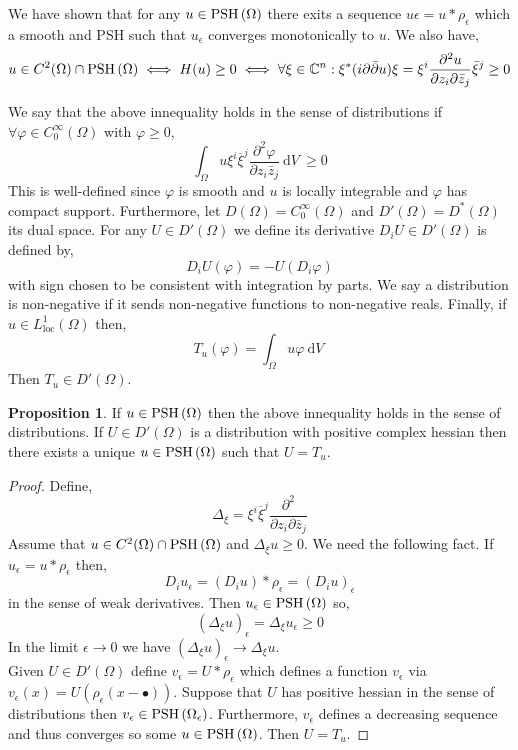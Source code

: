\documentclass[12pt]{extarticle}
\newcommand{\C}{\mathbb{C}}
\renewcommand{\d}[1]{\: \mathrm{d}#1 \:}
\theoremstyle{definition}
\newtheorem{proposition}[theorem]{Proposition}
\newenvironment{definition}[1][Definition:]{\begin{trivlist}
\item[\hskip \labelsep {\bfseries #1}]}{\end{trivlist}}
\begin{document}
We have shown that for any $u \in \mathrm{PSH}\left( \Omega \right)$ there exits a sequence $u\epsilon = u * \rho_\epsilon$ which a smooth and PSH such that $u_\epsilon$ converges monotonically to $u$. We also have,
\[ u \in C^2(\Omega) \cap \PSH{\Omega} \iff H(u) \ge 0 \iff \forall \xi \in \C^n  : \xi^* (i \partial \bar{\partial} u) \xi = \xi^i \frac{\partial^2 u}{\partial z_i \partial \bar{z}_j} \bar{\xi}^j \ge 0 \]


\begin{definition}
We say that the above innequality holds in the sense of distributions if $\forall \varphi \in C^\infty_0(\Omega)$ with $\varphi \ge 0$,
\[ \int_\Omega u \xi^i \overline{\xi}^j \frac{\partial^2 \varphi}{\partial z_i \bar{z}_j} \d{V} \ge 0 \]
This is well-defined since $\varphi$ is smooth and $u$ is locally integrable and $\varphi$ has compact support. Furthermore, let $D(\Omega) = C^\infty_0(\Omega)$ and $D'(\Omega) = D^*(\Omega)$ its dual space. For any $U \in D'(\Omega)$ we define its derivative $D_i U \in D'(\Omega)$ is defined by,
\[ D_i U(\varphi) = - U(D_i \varphi) \]
with sign chosen to be consistent with integration by parts. We say a distribution is non-negative if it sends non-negative functions to non-negative reals. Finally, if $u \in L^1_{\text{loc}}(\Omega)$ then,
\[ T_u(\varphi) = \int_{\Omega} u \varphi \d{V} \]
Then $T_u \in D'(\Omega)$. 
\end{definition}

\begin{proposition}
If $u \in \mathrm{PSH}\left( \Omega \right)$ then the above innequality holds in the sense of distributions. If $U \in D'(\Omega)$ is a distribution with positive complex hessian then there exists a unique $u \in \mathrm{PSH}\left( \Omega \right)$ such that $U = T_u$. 
\end{proposition}

\begin{proof}
Define,
\[ \Delta_\xi = \xi^i \overline{\xi}^j \frac{\partial^2}{\partial z_i \partial \bar{z}_j} \]
Assume that $u \in C^2(\Omega) \cap \mathrm{PSH}\left( \Omega \right)$ and $\Delta_\xi u \ge 0$. We need the following fact. If $u_\epsilon = u * \rho_\epsilon$ then,
\[ D_i u_\epsilon = (D_i u) * \rho_\epsilon = (D_i u)_\epsilon \]
in the sense of weak derivatives. Then $u_\epsilon \in \mathrm{PSH}\left( \Omega \right)$ so,
\[ (\Delta_\xi u)_\epsilon = \Delta_\xi u_\epsilon \ge 0 \]
In the limit $\epsilon \to 0$ we have $(\Delta_\xi u)_\epsilon \to \Delta_\xi u$. 
\bigskip\\
Given $U \in D'(\Omega)$ define $v_\epsilon = U * \rho_\epsilon$ which defines a function $v_\epsilon$ via $v_\epsilon(x) = U(\rho_\epsilon(x - \bullet))$.  Suppose that $U$ has positive hessian in the sense of distributions then $v_\epsilon \in \mathrm{PSH}\left( \Omega_\epsilon \right)$. Furthermore, $v_\epsilon$ defines a decreasing sequence and thus converges so some $u \in \mathrm{PSH}\left( \Omega \right)$. Then $U = T_u$. 
\end{proof}
\end{document}

